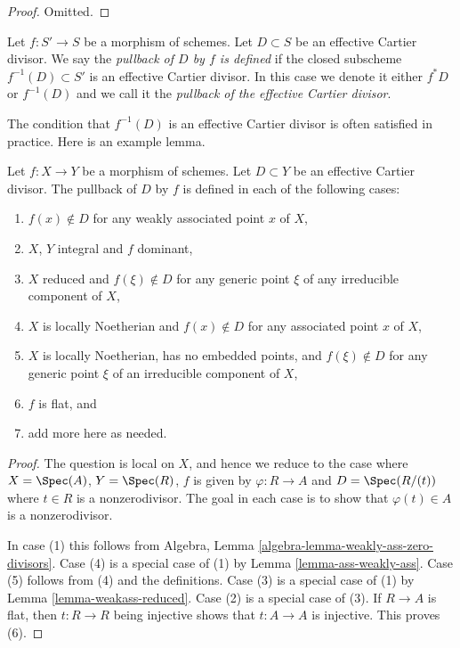 \begin{proof}
Omitted.
\end{proof}

\begin{definition}
\label{definition-pullback-effective-Cartier-divisor}
Let $f : S' \to S$ be a morphism of schemes. Let $D \subset S$
be an effective Cartier divisor. We say the {\it pullback of
$D$ by $f$ is defined} if the closed subscheme $f^{-1}(D) \subset S'$
is an effective Cartier divisor. In this case we denote it either
$f^*D$ or $f^{-1}(D)$ and we call it the
{\it pullback of the effective Cartier divisor}.
\end{definition}

\noindent
The condition that $f^{-1}(D)$ is an effective Cartier divisor
is often satisfied in practice. Here is an example lemma.

\begin{lemma}
\label{lemma-pullback-effective-Cartier-defined}
Let $f : X \to Y$ be a morphism of schemes.
Let $D \subset Y$ be an effective Cartier divisor.
The pullback of $D$ by $f$ is defined in each of the following cases:
\begin{enumerate}
\item $f(x) \not \in D$ for any weakly associated point $x$ of $X$,
\item $X$, $Y$ integral and $f$ dominant,
\item $X$ reduced and $f(\xi) \not \in D$ for any generic point $\xi$ of any
irreducible component of $X$,
\item $X$ is locally Noetherian and $f(x) \not \in D$ for any associated point
$x$ of $X$,
\item $X$ is locally Noetherian, has no embedded points, and
$f(\xi) \not \in D$ for any generic point $\xi$ of an irreducible component of
$X$,
\item $f$ is flat, and
\item add more here as needed.
\end{enumerate}
\end{lemma}

\begin{proof}
The question is local on $X$, and hence we reduce to the case
where $X = \Spec(A)$, $Y = \Spec(R)$, $f$ is
given by $\varphi : R \to A$ and
$D = \Spec(R/(t))$ where $t \in R$ is a nonzerodivisor.
The goal in each case is to show that $\varphi(t) \in A$
is a nonzerodivisor.

\medskip\noindent
In case (1) this follows from
Algebra, Lemma \ref{algebra-lemma-weakly-ass-zero-divisors}.
Case (4) is a special case of (1) by Lemma \ref{lemma-ass-weakly-ass}.
Case (5) follows from (4) and the definitions.
Case (3) is a special case of (1) by
Lemma \ref{lemma-weakass-reduced}.
Case (2) is a special case of (3).
If $R \to A$ is flat, then $t : R \to R$ being injective
shows that $t : A \to A$ is injective. This proves (6).
\end{proof}

